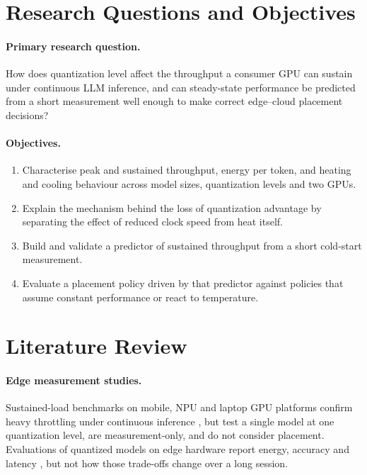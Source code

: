 \documentclass[11pt,a4paper]{article}
\begin{document}
\section{Research Questions and Objectives}
\paragraph{Primary research question.} How does quantization level affect the
throughput a consumer GPU can sustain under continuous LLM inference, and can
steady-state performance be predicted from a short measurement well enough to
make correct edge--cloud placement decisions?

\paragraph{Objectives.}
\begin{enumerate}
  \item Characterise peak and sustained throughput, energy per token, and heating
        and cooling behaviour across model sizes, quantization levels and two GPUs.
  \item Explain the mechanism behind the loss of quantization advantage by
        separating the effect of reduced clock speed from heat itself.
  \item Build and validate a predictor of sustained throughput from a short
        cold-start measurement.
  \item Evaluate a placement policy driven by that predictor against policies
        that assume constant performance or react to temperature.
\end{enumerate}

\section{Literature Review}

\paragraph{Edge measurement studies.} Sustained-load benchmarks on mobile, NPU and
laptop GPU platforms confirm heavy throttling under continuous inference
\cite{tummalapalli2026edge}, but test a single model at one quantization level,
are measurement-only, and do not consider placement. Evaluations of quantized
models on edge hardware report energy, accuracy and latency
\cite{husom2025sustainable}, but not how those trade-offs change over a long
session.
\end{document}
